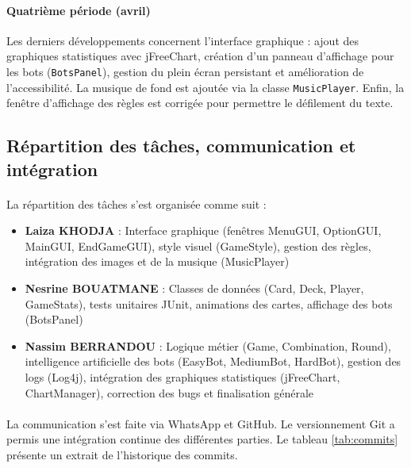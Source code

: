 \paragraph{Quatrième période (avril)}
Les derniers développements concernent l'interface graphique : ajout des graphiques statistiques avec jFreeChart, création d'un panneau d'affichage pour les bots (\texttt{BotsPanel}), gestion du plein écran persistant et amélioration de l'accessibilité. La musique de fond est ajoutée via la classe \texttt{MusicPlayer}. Enfin, la fenêtre d'affichage des règles est corrigée pour permettre le défilement du texte.

\subsection{Répartition des tâches, communication et intégration}
\paragraph{} La répartition des tâches s'est organisée comme suit :

\begin{itemize}
\item \textbf{Laiza KHODJA} : Interface graphique (fenêtres MenuGUI, OptionGUI, MainGUI, EndGameGUI), style visuel (GameStyle), gestion des règles, intégration des images et de la musique (MusicPlayer)
\item \textbf{Nesrine BOUATMANE} : Classes de données (Card, Deck, Player, GameStats), tests unitaires JUnit, animations des cartes, affichage des bots (BotsPanel)
\item \textbf{Nassim BERRANDOU} : Logique métier (Game, Combination, Round), intelligence artificielle des bots (EasyBot, MediumBot, HardBot), gestion des logs (Log4j), intégration des graphiques statistiques (jFreeChart, ChartManager), correction des bugs et finalisation générale
\end{itemize}

\paragraph{} La communication s'est faite via WhatsApp et GitHub. Le versionnement Git a permis une intégration continue des différentes parties. Le tableau \ref{tab:commits} présente un extrait de l'historique des commits.

